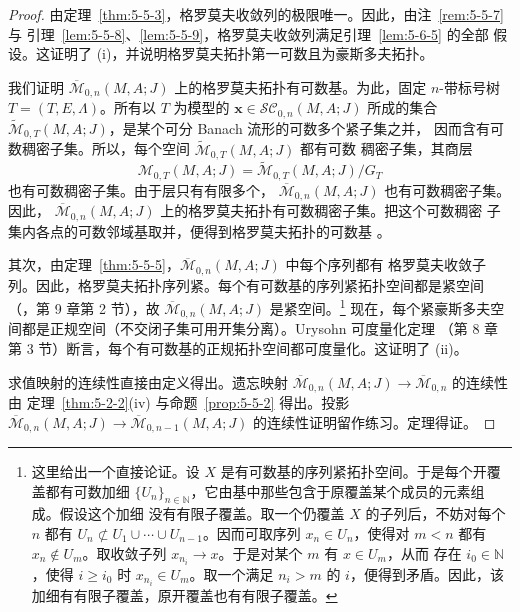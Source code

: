 \begin{proof}
由定理~\ref{thm:5-5-3}，格罗莫夫收敛列的极限唯一。因此，由注~\ref{rem:5-5-7} 与
引理~\ref{lem:5-5-8}、\ref{lem:5-5-9}，格罗莫夫收敛列满足引理~\ref{lem:5-6-5} 的全部
假设。这证明了 (i)，并说明格罗莫夫拓扑第一可数且为豪斯多夫拓扑。

我们证明 $\overline{\mathcal M}_{0,n}(M,A;J)$ 上的格罗莫夫拓扑有可数基。为此，固定
$n$-带标号树 $T=(T,E,\Lambda)$。所有以 $T$ 为模型的
$\mathbf x\in\mathcal{SC}_{0,n}(M,A;J)$ 所成的集合
$\widetilde{\mathcal M}_{0,T}(M,A;J)$，是某个可分 Banach 流形的可数多个紧子集之并，
因而含有可数稠密子集。所以，每个空间 $\widetilde{\mathcal M}_{0,T}(M,A;J)$ 都有可数
稠密子集，其商层
\[
  \mathcal M_{0,T}(M,A;J)
  =\widetilde{\mathcal M}_{0,T}(M,A;J)/G_T
\]
也有可数稠密子集。由于层只有有限多个，
$\overline{\mathcal M}_{0,n}(M,A;J)$ 也有可数稠密子集。因此，
$\overline{\mathcal M}_{0,n}(M,A;J)$ 上的格罗莫夫拓扑有可数稠密子集。把这个可数稠密
子集内各点的可数邻域基取并，便得到格罗莫夫拓扑的可数基
。

其次，由定理~\ref{thm:5-5-5}，$\overline{\mathcal M}_{0,n}(M,A;J)$ 中每个序列都有
格罗莫夫收敛子列。因此，格罗莫夫拓扑序列紧。每个有可数基的序列紧拓扑空间都是紧空间
（，第 9 章第 2 节），故
$\overline{\mathcal M}_{0,n}(M,A;J)$ 是紧空间。\footnote{这里给出一个直接论证。设 $X$
是有可数基的序列紧拓扑空间。于是每个开覆盖都有可数加细
$\{U_n\}_{n\in\mathbb N}$，它由基中那些包含于原覆盖某个成员的元素组成。假设这个加细
没有有限子覆盖。取一个仍覆盖 $X$ 的子列后，不妨对每个 $n$ 都有
$U_n\not\subset U_1\cup\cdots\cup U_{n-1}$。因而可取序列 $x_n\in U_n$，使得对 $m<n$
都有 $x_n\notin U_m$。取收敛子列 $x_{n_i}\to x$。于是对某个 $m$ 有 $x\in U_m$，从而
存在 $i_0\in\mathbb N$，使得 $i\ge i_0$ 时 $x_{n_i}\in U_m$。取一个满足 $n_i>m$ 的
$i$，便得到矛盾。因此，该加细有有限子覆盖，原开覆盖也有有限子覆盖。}
现在，每个紧豪斯多夫空间都是正规空间（不交闭子集可用开集分离）。Urysohn 可度量化定理
（第 8 章第 3 节）断言，每个有可数基的正规拓扑空间都可度量化。这证明了
(ii)。

求值映射的连续性直接由定义得出。遗忘映射
$\overline{\mathcal M}_{0,n}(M,A;J)\to\overline{\mathcal M}_{0,n}$ 的连续性由
定理~\ref{thm:5-2-2}\textup{(iv)} 与命题~\ref{prop:5-5-2} 得出。投影
$\overline{\mathcal M}_{0,n}(M,A;J)\to
\overline{\mathcal M}_{0,n-1}(M,A;J)$ 的连续性证明留作练习。定理得证。
\end{proof}
